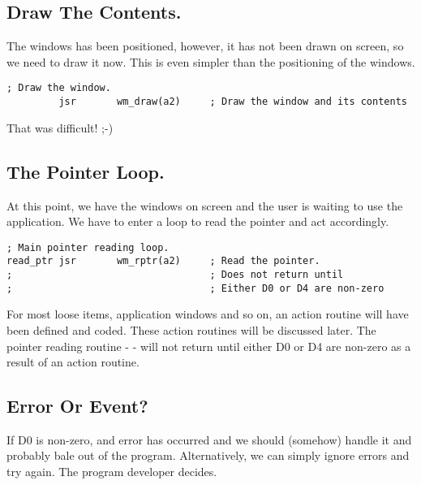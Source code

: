 \subsection{Draw The Contents.}

The windows has been positioned, however, it has not been drawn on
      screen, so we need to draw it now. This is even simpler than the
      positioning of the windows.

\begin{lstlisting}[firstnumber=last,caption={EasyPEasy Standard Code - Draw the Window},label={lst:EasyPEasy-6}]
; Draw the window.
         jsr       wm_draw(a2)     ; Draw the window and its contents
\end{lstlisting}

That was difficult! ;-{})

\subsection{The Pointer Loop.}

At this point, we have the windows on screen and the user is
      waiting to use the application. We have to enter a loop to read the
      pointer and act accordingly.

\begin{lstlisting}[firstnumber=last,caption={EasyPEasy Standard Code - Reading the Pointer},label={lst:EasyPEasy-7}]
; Main pointer reading loop.
read_ptr jsr       wm_rptr(a2)     ; Read the pointer. 
;                                  ; Does not return until
;                                  ; Either D0 or D4 are non-zero
\end{lstlisting}

For most loose items, application windows and so on, an action
      routine will have been defined and coded. These action routines will be
      discussed later. The pointer reading routine -{}  -{} will not return
      until either D0 or D4 are non-{}zero as a result of an action
      routine.

\subsection{Error Or Event?}

If D0 is non-{}zero, and error has occurred and we should (somehow)
      handle it and probably bale out of the program. Alternatively, we can
      simply ignore errors and try again. The program developer
      decides.

